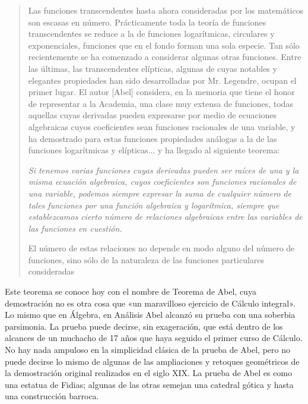 \documentclass[a4paper, 12pt, draft]{article}
\begin{document}
\begin{quote}\small

Las funciones transcendentes hasta ahora consideradas por los mate\-máticos son escasas en número. Prácticamente toda la teoría de funciones transcendentes se reduce a la de funciones logarítmicas, circulares y exponenciales, funciones que en el fondo forman una sola especie. Tan sólo recientemente se ha comenzado a considerar algunas otras funciones. Entre las últimas, las transcendentes elípticas, algunas de cuyas notables y elegantes propiedades han sido desarrolladas por Mr. Legendre, ocupan el primer lugar. El autor [Abel] considera, en la memoria que tiene el honor de representar a la Academia, una clase muy extensa de funciones, todas aquellas cuyas derivadas pueden expresarse por medio de ecuaciones algebraicas cuyos coeficientes sean funciones racionales de una variable, y ha demostrado para estas funciones propiedades análogas a la de las funciones logarítmicas y elípticas...  y ha llegado al siguiente teorema:

{\it Si tenemos varias funciones cuyas derivadas pueden ser raíces de una y la misma ecuación algebraica, cuyos coeficientes son funciones racionales de una variable, podemos siempre expresar la suma de cualquier número de tales funciones por una función algebraica y logarítmica, siempre que establezcamos cierto número de relaciones algebraicas entre las variables de las funciones en cuestión.}



El número de estas relaciones no depende en modo alguno del número de funciones, sino sólo de la naturaleza de las funciones particulares consideradas

\end{quote}

Este teorema se conoce hoy con el nombre de Teorema de Abel, cuya demostración no es otra cosa que «un maravilloso ejercicio de Cálculo integral». Lo mismo que en Álgebra, en Análisis Abel alcanzó su prueba con una soberbia parsimonia. La prueba puede decirse, sin exageración, que está dentro de los alcances de un muchacho de 17 años que haya seguido el primer curso de Cálculo. No hay nada ampuloso en la simplicidad clásica de la prueba de Abel, pero no puede decirse lo mismo de algunas de las ampliaciones y retoques geométricos de la demostración original realizados en el siglo XIX. La prueba de Abel es como una estatua de Fidias; algunas de las otras semejan una catedral gótica y hasta una construcción barroca.
\end{document}
